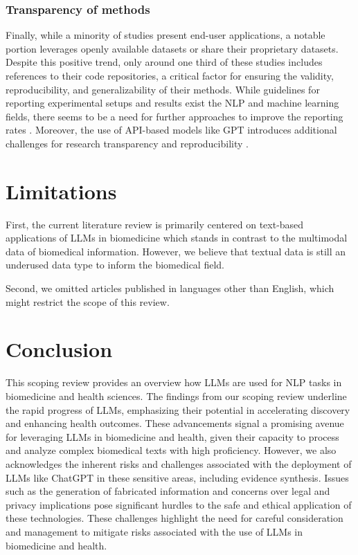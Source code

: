 \documentclass[fleqn,10pt]{olplainarticle}
\begin{document}
\subsubsection*{Transparency of methods}
Finally, while a minority of studies present end-user applications, a notable portion leverages openly available datasets or share their proprietary datasets. Despite this positive trend, only around one third of these studies includes references to their code repositories, a critical factor for ensuring the validity, reproducibility, and generalizability of their methods. While guidelines for reporting experimental setups and results exist the NLP and machine learning fields, there seems to be a need for further approaches to improve the reporting rates \citep{dodge2019show, kapoor2023reforms,magnusson2023reproducibility}. Moreover, the use of API-based models like GPT introduces additional challenges for research transparency and reproducibility \citep{liesenfeld2023opening}. %

\section*{Limitations}
\label{sec:limitations}
First, the current literature review is primarily centered on text-based applications of LLMs in biomedicine which stands in contrast to the multimodal data of biomedical information. However, we believe that textual data is still an underused data type to inform the biomedical field.

Second, we omitted articles published in languages other than English, which might restrict the scope of this review.



\section*{Conclusion}
\label{sec:conclusion}
This scoping review provides an overview how LLMs are used for NLP tasks in biomedicine and health sciences. The findings from our scoping review underline the rapid progress of LLMs, emphasizing their potential in accelerating discovery and enhancing health outcomes. These advancements signal a promising avenue for leveraging LLMs in biomedicine and health, given their capacity to process and analyze complex biomedical texts with high proficiency.
However, we also acknowledges the inherent risks and challenges associated with the deployment of LLMs like ChatGPT in these sensitive areas, including evidence synthesis. Issues such as the generation of fabricated information and concerns over legal and privacy implications pose significant hurdles to the safe and ethical application of these technologies. These challenges highlight the need for careful consideration and management to mitigate risks associated with the use of LLMs in biomedicine and health.
\end{document}
